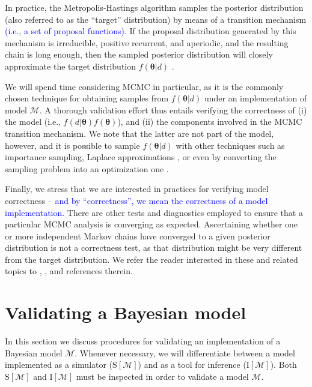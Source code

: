 \documentclass[oneside]{article}
\begin{document}
In practice, the Metropolis-Hastings algorithm samples the posterior distribution (also referred to as the ``target'' distribution) by means of a transition mechanism \textcolor{blue}{(i.e., a set of proposal functions)}. 
If the proposal distribution generated by this mechanism is irreducible, positive recurrent, and aperiodic, and the resulting chain is long enough, then the sampled posterior distribution will closely approximate the target distribution $f(\boldsymbol{\theta}|d)$ \citep{smith93,tierney94,gelman}.

We will spend time considering MCMC in particular, as it is the commonly chosen technique for obtaining samples from $f(\boldsymbol{\theta}|d)$ under an implementation of model $\mathcal{M}$.
A thorough validation effort thus entails verifying the correctness of (i) the model (i.e., $f(d|\boldsymbol{\theta})f(\boldsymbol{\theta})$), and (ii) the components involved in the MCMC transition mechanism.
We note that the latter are not part of the model, however, and it is  possible to sample $f(\boldsymbol{\theta}|d)$ with other techniques such as importance sampling, Laplace approximations \citep{inla}, or even by converting the sampling problem into an optimization one \citep[e.g.,][]{zhang18}.

Finally, we stress that we are interested in practices for verifying model correctness \textcolor{blue}{-- and by ``correctness'', we mean the correctness of a model implementation}.
There are other tests and diagnostics employed to ensure that a particular MCMC analysis is converging as expected.
Ascertaining whether one or more independent Markov chains have converged to a given posterior distribution is not a correctness test, as that distribution might be very different from the target distribution. 
We refer the reader interested in these and related topics to \cite{rwty}, \cite{fabreti2022}, \cite{magee2023} and references therein.

\section*{Validating a Bayesian model}

In this section we discuss procedures for validating an implementation of a Bayesian model $\mathcal{M}$.
Whenever necessary, we will differentiate between a model implemented as a simulator ($\text{S}[\mathcal{M}]$) and as a tool for inference ($\text{I}[\mathcal{M}]$).
Both $\text{S}[\mathcal{M}]$ and $\text{I}[\mathcal{M}]$ must be inspected in order to validate a model $\mathcal{M}$.
\end{document}
